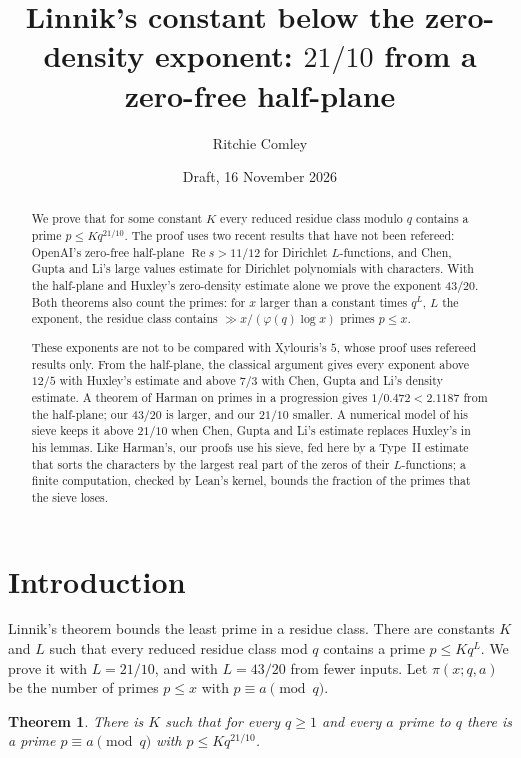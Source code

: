\documentclass[11pt]{article}
\title{Linnik's constant below the zero-density exponent: $21/10$ from a zero-free half-plane}
\author{Ritchie Comley}
\date{Draft, 16 November 2026}
\newtheorem{theorem}{Theorem}[section]
\theoremstyle{definition}
\begin{document}
\maketitle

\begin{abstract}
We prove that for some constant $K$ every reduced residue class modulo $q$ contains a prime $p \le K q^{21/10}$.
The proof uses two recent results that have not been refereed: OpenAI's zero-free half-plane
$\operatorname{Re} s > 11/12$ for Dirichlet $L$-functions, and Chen, Gupta and Li's large values estimate for
Dirichlet polynomials with characters. With the half-plane and Huxley's zero-density estimate alone we prove the
exponent $43/20$. Both theorems also count the primes: for $x$ larger than a constant times $q^L$, $L$ the exponent,
the residue class contains $\gg x/(\varphi(q) \log x)$ primes $p \le x$.

These exponents are not to be compared with Xylouris's $5$, whose proof uses refereed results only. From the
half-plane, the classical argument gives every exponent above $12/5$ with Huxley's estimate and above $7/3$ with Chen,
Gupta and Li's density estimate. A theorem of Harman on primes in a progression gives $1/0.472 < 2.1187$ from the
half-plane; our $43/20$ is larger, and our $21/10$ smaller. A numerical model of his sieve keeps it above $21/10$
when Chen, Gupta and Li's estimate replaces Huxley's in his lemmas. Like Harman's, our proofs use his sieve, fed here
by a Type~II estimate that sorts the characters by the largest real part of the zeros of their $L$-functions; a finite
computation, checked by Lean's kernel, bounds the fraction of the primes that the sieve loses.
\end{abstract}

\tableofcontents

\section{Introduction}\label{sec:intro}

Linnik's theorem bounds the least prime in a residue class. There are constants $K$ and $L$ such that every reduced
residue class mod $q$ contains a prime $p \le Kq^L$. We prove it with $L = 21/10$, and with $L = 43/20$ from fewer
inputs. Let $\pi(x; q, a)$ be the number of primes $p \le x$ with $p \equiv a \pmod q$.

\begin{theorem}\label{thm:2110}
There is $K$ such that for every $q \ge 1$ and every $a$ prime to $q$ there is a prime $p \equiv a \pmod q$ with
$p \le K q^{21/10}$.
\end{theorem}
\end{document}
